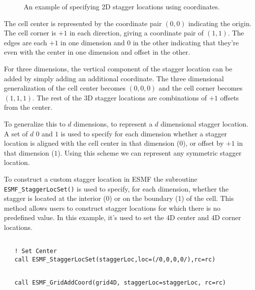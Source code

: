   \begin{center}
  \begin{figure}
  \center
  \caption{An example of specifying 2D stagger locations using coordinates.}
  \label{fig:gridcuststaggerloc}
  \end{figure}
  \end{center}
  
   The cell center is represented by the coordinate pair $(0,0)$ indicating the origin.
   The cell corner is $+1$ in each direction, giving a coordinate pair of $(1,1)$.
   The edges are each $+1$ in one dimension and $0$ in the other indicating that
   they're even with the center in one dimension and offset in the other.
  
   For three dimensions, the vertical component of the stagger location can be added by
   simply adding an additional coordinate. The three dimensional generalization of the
   cell center becomes $(0,0,0)$ and the cell corner becomes $(1,1,1)$. The rest of
   the 3D stagger locations are combinations of $+1$ offsets from the center.
  
   To generalize this to $d$ dimensions, to represent a $d$ dimensional stagger
   location. A set of $d$ $0$ and $1$ is used to specify for each dimension
   whether a stagger location is aligned with the cell center in that dimension ($0$),
   or offset by $+1$ in that dimension ($1$). Using this scheme we can represent
   any symmetric stagger location.
  
   To construct a custom stagger location in ESMF the subroutine
   {\tt ESMF\_StaggerLocSet()} is used to specify,
   for each dimension, whether the stagger is located at the interior (0)
   or on the boundary (1) of the cell. This method allows users
   to construct stagger locations for which
   there is no predefined value. In this example, it's used to
   set the 4D center and 4D corner locations.
   

 \begin{verbatim}

   ! Set Center
   call ESMF_StaggerLocSet(staggerLoc,loc=(/0,0,0,0/),rc=rc)
 
\end{verbatim}
 

 \begin{verbatim}
   call ESMF_GridAddCoord(grid4D, staggerLoc=staggerLoc, rc=rc)
 
\end{verbatim}
 
